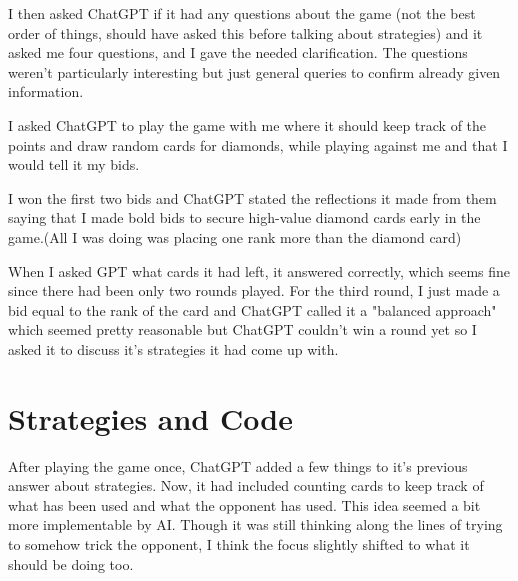 \documentclass{article}
\begin{document}
I then asked ChatGPT if it had any questions about the game (not the best order of things, should have asked this before talking about strategies) and it asked me four questions, and I gave the needed clarification. The questions weren't particularly interesting but just general queries to confirm already given information.

I asked ChatGPT to play the game with me where it should keep track of the points and draw random cards for diamonds, while playing against me and that I would tell it my bids.

I won the first two bids and ChatGPT stated the reflections it made from them saying that I made bold bids to secure high-value diamond cards early in the game.(All I was doing was placing one rank more than the diamond card)

When I asked GPT what cards it had left, it answered correctly, which seems fine since there had been only two rounds played. For the third round, I just made a bid equal to the rank of the card and ChatGPT called it a "balanced approach" which seemed pretty reasonable but ChatGPT couldn't win a round yet so I asked it to discuss it's strategies it had come up with.

\section{Strategies and Code}
After playing the game once, ChatGPT added a few things to it's previous answer about strategies. Now, it had included counting cards to keep track of what has been used and what the opponent has used. This idea seemed a bit more implementable by AI. Though it was still thinking along the lines of trying to somehow trick the opponent, I think the focus slightly shifted to what it should be doing too.
\end{document}
